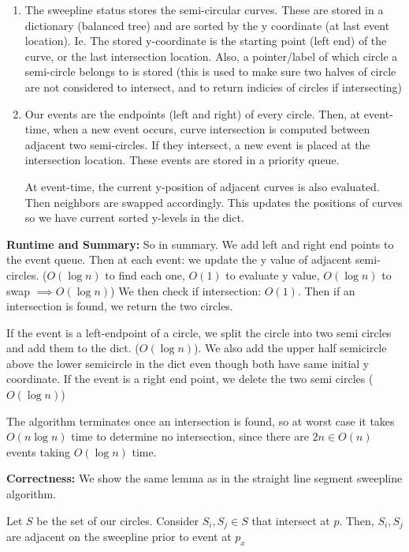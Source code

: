 \documentclass[11pt]{article}
\begin{document}
\begin{enumerate}[(1)]
    \item The sweepline status stores the semi-circular curves.
        These are stored in a dictionary (balanced tree) and are sorted by the y coordinate (at last event location).
        Ie. The stored y-coordinate is the starting point (left end) of the curve, or the last intersection location.
        Also, a pointer/label of which circle a semi-circle belongs to is stored 
        (this is used to make sure two halves of circle are not considered to intersect, and to return indicies of circles if intersecting)

    \item Our events are the endpoints (left and right) of every circle. 
    Then, at event-time, when a new event occurs, curve intersection is computed between adjacent 
    two semi-circles. If they intersect, a new event is placed at the intersection location. 
    These events are stored in a priority queue. 

    At event-time, the current y-position of adjacent curves is also evaluated. Then neighbors are swapped accordingly.
    This updates the positions of curves so we have current sorted y-levels in the dict. 
\end{enumerate}


\textbf{Runtime and Summary: }So in summary. We add left and right end points to the event queue. 
Then at each event: we update the y value of adjacent semi-circles. 
($O(\log n)$ to find each one, $O(1)$ to evaluate y value, $O(\log n)$ to swap $\implies O(\log n)$)
We then check if intersection: $O(1)$. Then if an intersection is found, we return the two circles.

If the event is a left-endpoint of a circle, we split the circle into two semi circles and add them to the dict.
($O(\log n)$). We also add the upper half semicircle above the lower semicircle in the dict even though both have same initial y coordinate.
If the event is a right end point, we delete the two semi circles ($O(\log n)$)

The algorithm terminates once an intersection is found, so at worst case it takes $O(n \log n)$ time to determine no intersection,
since there are $2n \in O(n)$ events taking $O(\log n)$ time.


\textbf{Correctness: } We show the same lemma as in the straight line segment sweepline algorithm.

\begin{lemma}
    Let $S$ be the set of our circles. Consider $S_i, S_j \in S$ that intersect at $p$.
    Then, $S_i, S_j$ are adjacent on the sweepline prior to event at $p_x$
\end{lemma}
\end{document}
